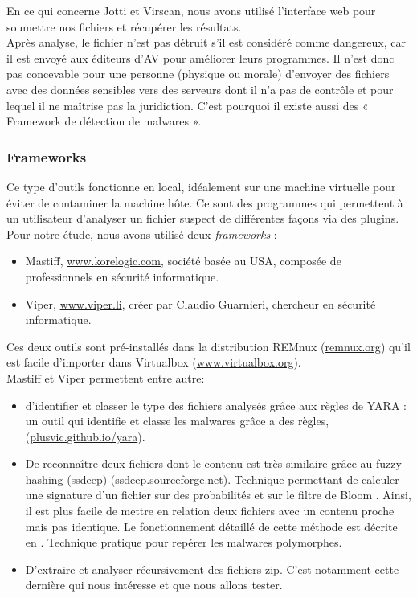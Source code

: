 \documentclass{svjour3}
\begin{document}
$ $\\
En ce qui concerne Jotti et Virscan, nous avons utilisé l'interface web pour soumettre nos fichiers et récupérer les résultats.\\
$ $\\
Après analyse, le fichier n'est pas détruit s'il est considéré comme dangereux, car il est envoyé aux éditeurs d'AV pour améliorer leurs programmes. Il n'est donc pas concevable pour une personne (physique ou morale) d'envoyer des fichiers avec des données sensibles vers des serveurs dont il n'a pas de contrôle et pour lequel il ne maîtrise pas la juridiction. C'est pourquoi il existe aussi des « Framework de détection de malwares ».\\

\subsubsection{Frameworks}
Ce type d'outils fonctionne en local, idéalement sur une machine virtuelle pour éviter de contaminer la machine hôte. Ce sont des programmes qui permettent à un utilisateur d'analyser un fichier suspect de différentes façons via des plugins. Pour notre étude, nous avons utilisé deux \textit{frameworks} : 
\label{2.2.2frameworks}
\begin{itemize}
\item Mastiff, \url{www.korelogic.com}, société basée au USA, composée de professionnels en sécurité informatique.
\item Viper, \url{www.viper.li}, créer par Claudio Guarnieri, chercheur en sécurité informatique.
\end{itemize}
Ces deux outils sont pré-installés dans la distribution REMnux (\url{remnux.org}) qu'il est facile d'importer dans Virtualbox (\url{www.virtualbox.org}).\\
Mastiff et Viper permettent entre autre:
\begin{itemize}
\item d’identifier et classer le type des fichiers analysés grâce aux règles de YARA : un outil qui identifie et classe les malwares grâce a des règles, (\url{plusvic.github.io/yara}).
\item De reconnaître deux fichiers dont le contenu est très similaire grâce au fuzzy hashing (ssdeep) (\url{ssdeep.sourceforge.net}). Technique permettant de calculer une signature d'un fichier sur des probabilités et sur le filtre de Bloom \cite{Bloom}. Ainsi, il est plus facile de mettre en relation deux fichiers avec un contenu proche mais pas identique. Le fonctionnement détaillé de cette méthode est décrite en \cite{Tournier}. Technique pratique pour repérer les malwares polymorphes.
\item D'extraire et analyser récursivement des fichiers zip. C'est notamment cette dernière qui nous intéresse et que nous allons tester.
\end{itemize}
\end{document}
